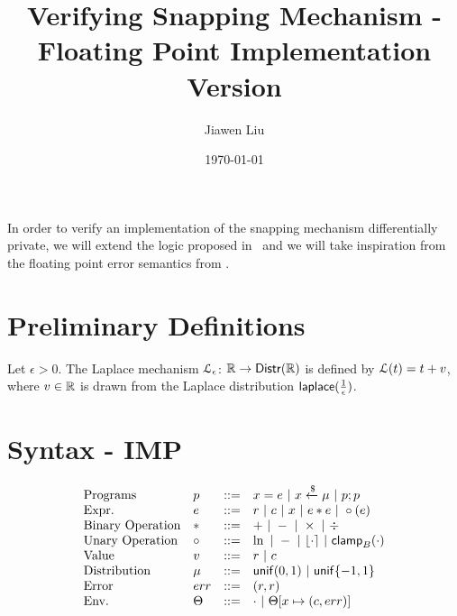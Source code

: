 \documentclass[a4paper,11pt]{article}
\begin{document}
\title{Verifying Snapping Mechanism - Floating Point Implementation Version}
\author{Jiawen Liu}

\date{\today}

\maketitle
In order to verify an implementation of the snapping mechanism
\cite{mironov2012significance} differentially private, we will extend
the logic proposed in~\cite{barthe2016proving} and we will take
inspiration from the floating
point error semantics from
\cite{Ramananandro2016unified,Martel2006higher,Becker2018verified,Moscato2017Automatic}.

\section{Preliminary Definitions}
\begin{defn}
Let $\epsilon > 0$. The Laplace mechanism  $\mathcal{L}_{\epsilon}$: $\mathbb{R} \to \mathsf{Distr}(\mathbb{R})$ is defined by $\mathcal{L}(t) = t + v$, where $v \in \mathbb{R}$ is drawn from the Laplace distribution $\mathsf{laplace}(\frac{1}{\epsilon})$.
\end{defn}
%
%
%

\section{Syntax - IMP}
\[\begin{array}{llll}
\mbox{Programs} & \prog & ::= & 
     \varx = \expr ~|~ \varx \samplel \edistr
	~|~ \prog ; \prog \\

\mbox{Expr.} & \expr & ::= & \rval ~|~  \fval
	~|~ \varx  ~|~ \expr \bop \expr
	~|~ \uop (\expr) \\
%
\mbox{Binary Operation} & \bop & ::= & + ~|~ - ~|~ \times ~|~ \div \\
%
\mbox{Unary Operation} & \uop & ::= & \ln ~|~ - ~|~ \round{\cdot} 
	~|~ \clamp_B(\cdot) \\
%
\mbox{Value} & \valv & ::= & \rval ~|~  \fval \\
%
\mbox{Distribution} & \edistr & ::= & \uniform(0, 1) 
%
	~|~ \uniform\{-1, 1\}\\ 
%
\mbox{Error} & \err & ::= & (\rval, \rval) \\
%
\mbox{Env.} & \trsenv & ::= & \cdot ~|~ \trsenv[x \mapsto (\fval, \err)] 
\end{array}
\]
\end{document}
